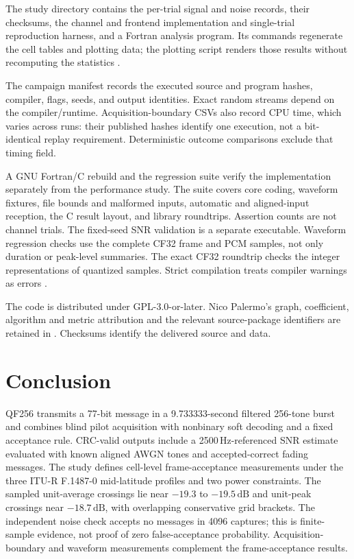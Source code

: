 \documentclass[11pt,a4paper]{article}
\newcommand{\dB}{\,\mathrm{dB}}
\begin{document}
The study directory contains the per-trial signal and noise records, their
checksums, the channel and frontend implementation and single-trial
reproduction harness, and a Fortran analysis program. Its commands regenerate
the cell tables and plotting data; the plotting script renders those results
without recomputing the statistics \cite{study}.

The campaign manifest records the executed source and program hashes,
compiler, flags, seeds, and output identities. Exact random streams depend
on the compiler/runtime. Acquisition-boundary CSVs also record CPU time,
which varies across runs: their published hashes identify one execution,
not a bit-identical replay requirement. Deterministic outcome comparisons
exclude that timing field.

A GNU Fortran/C rebuild and the regression suite verify the
implementation separately from the performance study. The suite covers
core coding, waveform fixtures, file bounds and malformed inputs, automatic
and aligned-input reception, the C result layout, and library roundtrips.
Assertion counts are not channel trials. The fixed-seed SNR validation is
a separate executable. Waveform regression checks use the complete CF32
frame and PCM samples, not only duration or peak-level summaries.
The exact CF32 roundtrip checks the integer representations of quantized
samples. Strict compilation treats compiler warnings as errors
\cite{verification}.

The code is distributed under GPL-3.0-or-later. Nico Palermo's graph,
coefficient, algorithm and metric attribution and the relevant source-package
identifiers are retained in . Checksums identify
the delivered source and data.

\section{Conclusion}

QF256 transmits a 77-bit message in a 9.733333-second filtered 256-tone burst
and combines blind pilot acquisition with nonbinary soft decoding and a
fixed acceptance rule. CRC-valid outputs include a 2500\,Hz-referenced SNR
estimate evaluated with known aligned AWGN tones and accepted-correct
fading messages. The study defines cell-level frame-acceptance measurements
under the three ITU-R F.1487-0 mid-latitude profiles and two power constraints.
The sampled unit-average crossings lie near $-19.3$ to $-19.5\dB$ and
unit-peak crossings near $-18.7\dB$, with overlapping conservative grid
brackets. The independent noise check accepts no messages in 4096 captures;
this is finite-sample evidence, not proof of zero false-acceptance probability.
Acquisition-boundary and waveform measurements complement the
frame-acceptance results.
\end{document}
